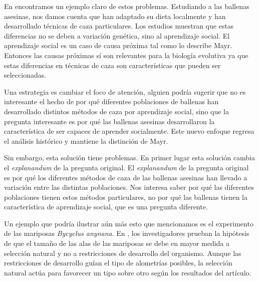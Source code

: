 {%


En \cite{Uller2019} encontramos un ejemplo claro de estos problemas. Estudiando a las ballenas asesinas, nos damos cuenta que han adaptado su dieta localmente y han desarrollado técnicas de caza particulares. Los estudios muestran que estas diferencias no se deben a variación genética, sino al aprendizaje social. El aprendizaje social es un caso de causa próxima tal como lo describe Mayr. Entonces las causas próximas sí son relevantes para la biología evolutiva ya que estas diferencias en técnicas de caza son características que pueden ser seleccionadas.

Una estrategia es cambiar el foco de atención, alguien podría sugerir que no es interesante el hecho de por qué diferentes poblaciones de ballenas han desarrollado distintos métodos de caza por aprendizaje social, sino que la pregunta interesante es por qué las ballenas asesinas desarrollaron la característica de ser capaces de aprender socialmente. Este nuevo enfoque regresa el análisis histórico y mantiene la distinción de Mayr.

Sin embargo, esta solución tiene problemas. En primer lugar esta solución cambia el \emph{explanandum} de la pregunta original. El \emph{explanandum} de la pregunta original es por qué los diferentes métodos de caza de las ballenas asesinas han llevado a variación entre las distintas poblaciones. Nos interesa saber por qué las diferentes poblaciones tienen estos métodos particulares, no por qué las ballenas tienen la característica de aprendizaje social, que es una pregunta diferente.

Un ejemplo que podría ilustrar aún más esto que mencionamos es el experimento de las mariposas \textit{Bycyclus anynana}. En \cite{Frankino2007}, los investigadores prueban la hipótesis de que el tamaño de las alas de las mariposas se debe en mayor medida a selección natural y no a restricciones de desarrollo del organismo. Aunque las restricciones de desarrollo guían el tipo de alometrías posibles, la selección natural actúa para favorecer un tipo sobre otro según los resultados del artículo.

}
